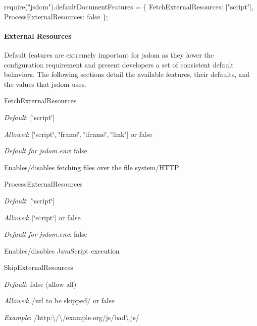 \begin{DoxyCode}
require("jsdom").defaultDocumentFeatures = \{
    FetchExternalResources: ["script"],
    ProcessExternalResources: false
\};
\end{DoxyCode}


\paragraph*{External Resources}

Default features are extremely important for jsdom as they lower the configuration requirement and present developers a set of consistent default behaviors. The following sections detail the available features, their defaults, and the values that jsdom uses.

{\ttfamily Fetch\+External\+Resources}


\begin{DoxyItemize}
\item {\itshape Default}\+: {\ttfamily \mbox{[}\char`\"{}script\char`\"{}\mbox{]}}
\item {\itshape Allowed}\+: {\ttfamily \mbox{[}\char`\"{}script\char`\"{}, \char`\"{}frame\char`\"{}, \char`\"{}iframe\char`\"{}, \char`\"{}link\char`\"{}\mbox{]}} or {\ttfamily false}
\item {\itshape Default for {\ttfamily jsdom.\+env}}\+: {\ttfamily false}
\end{DoxyItemize}

Enables/disables fetching files over the file system/\+H\+T\+TP

{\ttfamily Process\+External\+Resources}


\begin{DoxyItemize}
\item {\itshape Default}\+: {\ttfamily \mbox{[}\char`\"{}script\char`\"{}\mbox{]}}
\item {\itshape Allowed}\+: {\ttfamily \mbox{[}\char`\"{}script\char`\"{}\mbox{]}} or {\ttfamily false}
\item {\itshape Default for {\ttfamily jsdom.\+env}}\+: {\ttfamily false}
\end{DoxyItemize}

Enables/disables Java\+Script execution

{\ttfamily Skip\+External\+Resources}


\begin{DoxyItemize}
\item {\itshape Default}\+: {\ttfamily false} (allow all)
\item {\itshape Allowed}\+: {\ttfamily /url to be skipped/} or {\ttfamily false}
\item {\itshape Example}\+: {\ttfamily /http\+:\textbackslash{}/\textbackslash{}/example.org/js/bad\textbackslash{}.js/}
\end{DoxyItemize}

